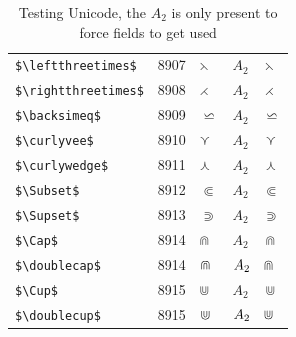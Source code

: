 ﻿\documentclass{article}
\begin{document}
\begin{table}
\begin{center}
\begin{tabular}{llll}
 \verb#$\leftthreetimes$#   & 8907    & $\leftthreetimes$   & $A_2\quad \leftthreetimes$\\
 \verb#$\rightthreetimes$#  & 8908    & $\rightthreetimes$  & $A_2\quad \rightthreetimes$\\
 \verb#$\backsimeq$#        & 8909    & $\backsimeq$        & $A_2\quad \backsimeq$\\
 \verb#$\curlyvee$#         & 8910    & $\curlyvee$         & $A_2\quad \curlyvee$\\
 \verb#$\curlywedge$#       & 8911    & $\curlywedge$       & $A_2\quad \curlywedge$\\
 \verb#$\Subset$#           & 8912    & $\Subset$           & $A_2\quad \Subset$\\
 \verb#$\Supset$#           & 8913    & $\Supset$           & $A_2\quad \Supset$\\
 \verb#$\Cap$#              & 8914    & $\Cap$              & $A_2\quad \Cap$\\
 \verb#$\doublecap$#        & 8914    & $\doublecap$        & $A_2\quad \doublecap$\\
 \verb#$\Cup$#              & 8915    & $\Cup$              & $A_2\quad \Cup$\\
 \verb#$\doublecup$#        & 8915    & $\doublecup$        & $A_2\quad \doublecup$\\
\end{tabular}
\end{center}
\caption{Testing Unicode, the $A_2$ is only present to force fields to get used}
\end{table}
\clearpage
\end{document}
